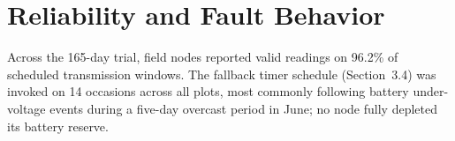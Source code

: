 \section{Reliability and Fault Behavior}
Across the 165-day trial, field nodes reported valid readings on 96.2\% of scheduled
transmission windows. The fallback timer schedule (Section~3.4) was invoked on 14 occasions
across all plots, most commonly following battery under-voltage events during a five-day
overcast period in June; no node fully depleted its battery reserve.

